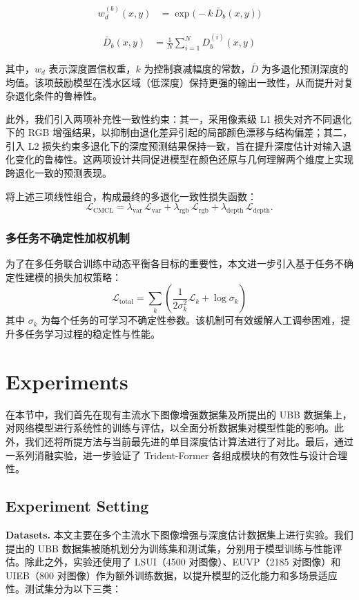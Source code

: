 \documentclass[twocolumn]{article}
\begin{document}
\begin{align}
w_d^{(b)}(x,y) &= \exp\bigl(-k\,\bar D_b(x,y)\bigr)
\end{align}

\begin{align}
\bar D_b(x,y) &= \frac{1}{N} \sum_{i=1}^N D^{(i)}_b(x,y)
\end{align}


其中，$w_d$ 表示深度置信权重，$k$ 为控制衰减幅度的常数，$\bar D$ 为多退化预测深度的均值。该项鼓励模型在浅水区域（低深度）保持更强的输出一致性，从而提升对复杂退化条件的鲁棒性。


此外，我们引入两项补充性一致性约束：其一，采用像素级 L1 损失对齐不同退化下的 RGB 增强结果，以抑制由退化差异引起的局部颜色漂移与结构偏差；其二，引入 L2 损失约束多退化下的深度预测结果保持一致，旨在提升深度估计对输入退化变化的鲁棒性。这两项设计共同促进模型在颜色还原与几何理解两个维度上实现跨退化一致的预测表现。


将上述三项线性组合，构成最终的多退化一致性损失函数：
\[
\mathcal{L}_{\mathrm{CMCL}} =
\lambda_{\mathrm{var}}\,\mathcal{L}_{\mathrm{var}} +
\lambda_{\mathrm{rgb}}\,\mathcal{L}_{\mathrm{rgb}} +
\lambda_{\mathrm{depth}}\,\mathcal{L}_{\mathrm{depth}}.
\]

\subsubsection{多任务不确定性加权机制}
为了在多任务联合训练中动态平衡各目标的重要性，本文进一步引入基于任务不确定性建模的损失加权策略：
\[
\mathcal{L}_{\text{total}} = \sum_k \left(\frac{1}{2\sigma_k^2} \mathcal{L}_k + \log \sigma_k\right)
\]
其中 $\sigma_k$ 为每个任务的可学习不确定性参数。该机制可有效缓解人工调参困难，提升多任务学习过程的稳定性与性能。

\section{Experiments}
在本节中，我们首先在现有主流水下图像增强数据集及所提出的 UBB 数据集上，对网络模型进行系统性的训练与评估，以全面分析数据集对模型性能的影响。此外，我们还将所提方法与当前最先进的单目深度估计算法进行了对比。最后，通过一系列消融实验，进一步验证了 Trident-Former 各组成模块的有效性与设计合理性。

\subsection{Experiment Setting}

\textbf{Datasets.} 本文主要在多个主流水下图像增强与深度估计数据集上进行实验。我们提出的 UBB 数据集被随机划分为训练集和测试集，分别用于模型训练与性能评估。除此之外，实验还使用了 LSUI（4500 对图像）、EUVP（2185 对图像）和 UIEB（800 对图像）作为额外训练数据，以提升模型的泛化能力和多场景适应性。测试集分为以下三类：
\end{document}
